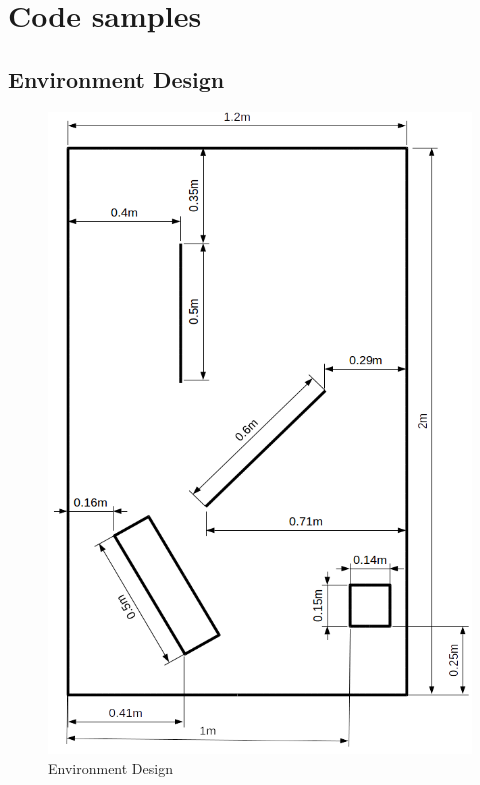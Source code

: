 \chapter{Code samples}
\newpage
\section{Environment Design}
\begin{figure}[h]
\begin{center}
\includegraphics[scale=0.6]{Chapter1/images/environment.png} 
\caption{Environment Design}
\label{appendix2:environment}
\end{center}
\end{figure}

